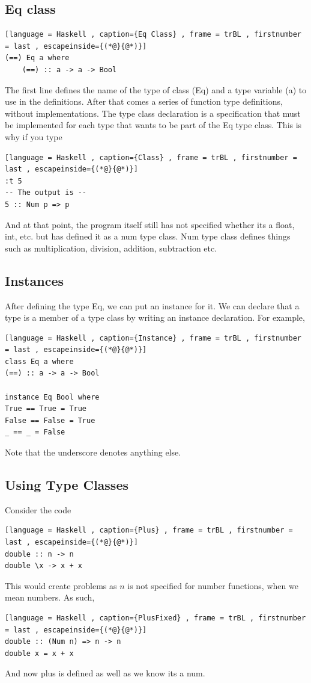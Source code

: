 \documentclass[a4paper]{article}
\theoremstyle{plain}
\theoremstyle{definition}
\theoremstyle{remark}
\begin{document}
\subsection{Eq class}
\begin{lstlisting}[language = Haskell , caption={Eq Class} , frame = trBL , firstnumber = last , escapeinside={(*@}{@*)}]
(==) Eq a where
	(==) :: a -> a -> Bool
\end{lstlisting}
The first line defines the name of the type of class (Eq) and a type variable (a) to use in the definitions. After that comes a series of function type definitions, without implementations. The type class declaration is a specification that must be implemented for each type that wants to be part of the Eq type class. This is why if you type
\begin{lstlisting}[language = Haskell , caption={Class} , frame = trBL , firstnumber = last , escapeinside={(*@}{@*)}]
:t 5
-- The output is --
5 :: Num p => p 
\end{lstlisting}
And at that point, the program itself still has not specified whether its a float, int, etc. but has defined it as a num type class. Num type class defines things such as multiplication, division, addition, subtraction etc.
\subsection{Instances}
After defining the type Eq, we can put an instance for it. We can declare that a type is a member of a type class by writing an instance declaration. For example,
\begin{lstlisting}[language = Haskell , caption={Instance} , frame = trBL , firstnumber = last , escapeinside={(*@}{@*)}]
class Eq a where
(==) :: a -> a -> Bool

instance Eq Bool where
True == True = True
False == False = True
_ == _ = False
\end{lstlisting}
Note that the underscore denotes anything else.
\subsection{Using Type Classes}
Consider the code
\begin{lstlisting}[language = Haskell , caption={Plus} , frame = trBL , firstnumber = last , escapeinside={(*@}{@*)}]
double :: n -> n
double \x -> x + x
\end{lstlisting}
This would create problems as $n$ is not specified for number functions, when we mean numbers. As such,
\begin{lstlisting}[language = Haskell , caption={PlusFixed} , frame = trBL , firstnumber = last , escapeinside={(*@}{@*)}]
double :: (Num n) => n -> n
double x = x + x
\end{lstlisting}
And now plus is defined as well as we know its a num.
\end{document}
